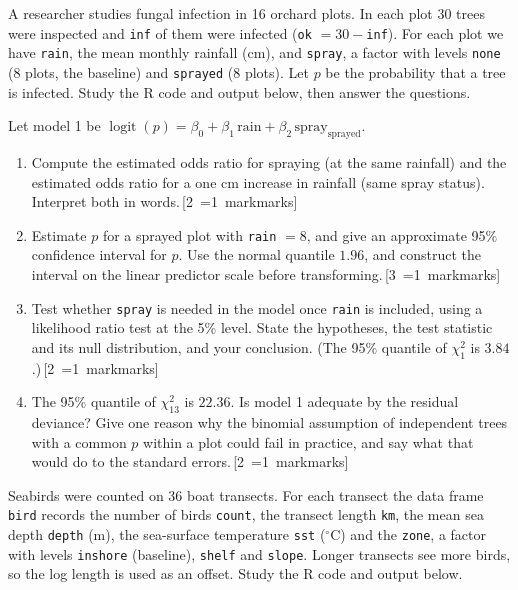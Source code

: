 \documentclass[11pt,a4paper]{article}
\newcommand{\mk}[1]{\hfill\hspace*{\fill}\mbox{\,[#1~\ifnum#1=1 mark\else marks\fi]}}
\newcommand{\ans}[1]{\par\nopagebreak[4]\vspace{2pt}\noindent\fbox{\rule{0pt}{#1}\hspace{\dimexpr\linewidth-2\fboxsep-2\fboxrule\relax}}\par\vspace{4pt}}
\newcommand{\qhead}[2]{\Needspace{10\baselineskip}\vspace{10pt}{\large\bfseries Question #1 (#2 marks)}\par\vspace{2pt}}
\newcommand{\R}[1]{\VerbatimInput[fontsize=\footnotesize,frame=single,framesep=2mm,rulecolor=\color{black!50}]{final/r/out/#1}}
\renewcommand{\R}[1]{\VerbatimInput[fontsize=\scriptsize,frame=single,framesep=1.5mm,rulecolor=\color{black!50}]{r/out/#1}}
\begin{document}
\clearpage
\qhead{3}{9}
A researcher studies fungal infection in 16 orchard plots. In each plot 30 trees were inspected and \texttt{inf} of them were infected (\texttt{ok} $=30-$\texttt{inf}). For each plot we have \texttt{rain}, the mean monthly rainfall (cm), and \texttt{spray}, a factor with levels \texttt{none} (8 plots, the baseline) and \texttt{sprayed} (8 plots). Let $p$ be the probability that a tree is infected. Study the R code and output below, then answer the questions.

\R{d_q3.txt}

Let model 1 be $\operatorname{logit}(p)=\beta_0+\beta_1\,\text{rain}+\beta_2\,\text{spray}_{\text{sprayed}}$.

\begin{enumerate}
\item Compute the estimated odds ratio for spraying (at the same rainfall) and the estimated odds ratio for a one cm increase in rainfall (same spray status). Interpret both in words.\mk{2}
\ans{3.8cm}
\item Estimate $p$ for a sprayed plot with \texttt{rain} $=8$, and give an approximate 95\% confidence interval for $p$. Use the normal quantile $1.96$, and construct the interval on the linear predictor scale before transforming.\mk{3}
\ans{6.5cm}
\item Test whether \texttt{spray} is needed in the model once \texttt{rain} is included, using a likelihood ratio test at the 5\% level. State the hypotheses, the test statistic and its null distribution, and your conclusion. (The 95\% quantile of $\chi^2_1$ is $3.84$.)\mk{2}
\ans{4cm}
\item The 95\% quantile of $\chi^2_{13}$ is $22.36$. Is model 1 adequate by the residual deviance? Give one reason why the binomial assumption of independent trees with a common $p$ within a plot could fail in practice, and say what that would do to the standard errors.\mk{2}
\ans{4cm}
\end{enumerate}

\clearpage
\qhead{4}{10}
Seabirds were counted on 36 boat transects. For each transect the data frame \texttt{bird} records the number of birds \texttt{count}, the transect length \texttt{km}, the mean sea depth \texttt{depth} (m), the sea-surface temperature \texttt{sst} ($^\circ$C) and the \texttt{zone}, a factor with levels \texttt{inshore} (baseline), \texttt{shelf} and \texttt{slope}. Longer transects see more birds, so the log length is used as an offset. Study the R code and output below.
\end{document}
